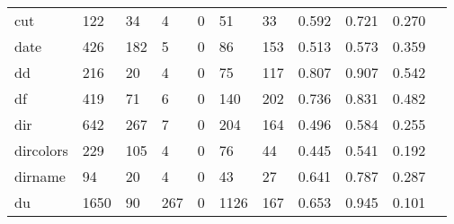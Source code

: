 \begin{longtable}{lp{1.10cm}p{1.10cm}p{1.10cm}p{1.10cm}p{1.10cm}p{1.10cm}p{1.10cm}p{1.10cm}p{1.10cm}p{1.10cm}}
cut       &                    122 &                                 34 &                                 4 &                                0 &                                51 &                              33 &                          0.592 &                                 0.721 &                               0.270 \\
date      &                    426 &                                182 &                                 5 &                                0 &                                86 &                             153 &                          0.513 &                                 0.573 &                               0.359 \\
dd        &                    216 &                                 20 &                                 4 &                                0 &                                75 &                             117 &                          0.807 &                                 0.907 &                               0.542 \\
df        &                    419 &                                 71 &                                 6 &                                0 &                               140 &                             202 &                          0.736 &                                 0.831 &                               0.482 \\
dir       &                    642 &                                267 &                                 7 &                                0 &                               204 &                             164 &                          0.496 &                                 0.584 &                               0.255 \\
dircolors &                    229 &                                105 &                                 4 &                                0 &                                76 &                              44 &                          0.445 &                                 0.541 &                               0.192 \\
dirname   &                     94 &                                 20 &                                 4 &                                0 &                                43 &                              27 &                          0.641 &                                 0.787 &                               0.287 \\
du        &                   1650 &                                 90 &                               267 &                                0 &                              1126 &                             167 &                          0.653 &                                 0.945 &                               0.101 \\

\end{longtable}
